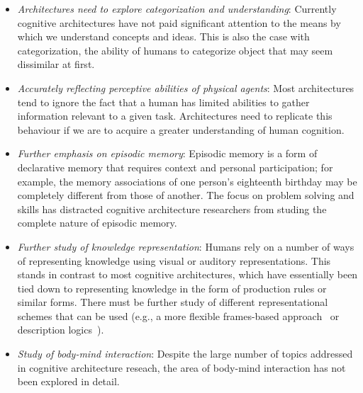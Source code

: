 \begin{itemize}
\item \emph{Architectures need to explore categorization and
    understanding}: Currently cognitive architectures have not paid
  significant attention to the means by which we understand concepts
  and ideas. This is also the case with categorization, the ability of
  humans to categorize object that may seem dissimilar at first.
  
\item \emph{Accurately reflecting perceptive abilities of physical
    agents}: Most architectures tend to ignore the fact that a human
  has limited abilities to gather information relevant to a given
  task. Architectures need to replicate this behaviour if we are to
  acquire a greater understanding of human cognition.

\item \emph{Further emphasis on episodic memory}: Episodic memory is a
  form of declarative memory that requires context and personal
  participation\cite{09011999}; for example, the memory associations
  of one person's eighteenth birthday may be completely different from
  those of another.  The focus on problem solving and skills has
  distracted cognitive architecture researchers from studing the
  complete nature of episodic memory.

\item \emph{Further study of knowledge representation}: Humans rely on
  a number of ways of representing knowledge using visual or auditory
  representations.  This stands in contrast to most cognitive
  architectures, which have essentially been tied down to representing
  knowledge in the form of production rules or similar forms. There
  must be further study of different representational schemes that can
  be used (e.g., a more flexible frames-based
  approach~\cite{Minsky1974a} or description
  logics~\cite{nardi-brachman:2003a}).

\item \emph{Study of body-mind interaction}: Despite the large number
  of topics addressed in cognitive architecture reseach, the area of
  body-mind interaction has not been explored in detail.



\end{itemize}
